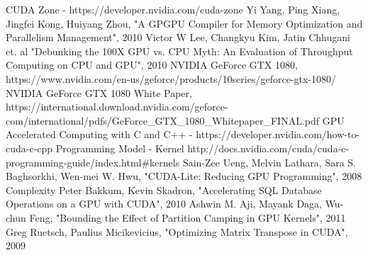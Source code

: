 \documentclass[conference]{IEEEtran}
\begin{document}
\begin{thebibliography}{00}
 CUDA Zone - https://developer.nvidia.com/cuda-zone
 Yi Yang, Ping Xiang, Jingfei Kong, Huiyang Zhou, "A GPGPU Compiler for Memory Optimization and Parallelism Management", 2010
 Victor W Lee, Changkyu Kim, Jatin Chhugani et. al "Debunking the 100X GPU vs. CPU Myth: An Evaluation of Throughput Computing on CPU and GPU", 2010
 NVIDIA GeForce GTX 1080, https://www.nvidia.com/en-us/geforce/products/10series/geforce-gtx-1080/
 NVIDIA GeForce GTX 1080 White Paper,
https://international.download.nvidia.com/geforce-com/international/pdfs/GeForce\_GTX\_1080\_Whitepaper\_FINAL.pdf
 GPU Accelerated Computing with C and C++ - https://developer.nvidia.com/how-to-cuda-c-cpp
 Programming Model - Kernel http://docs.nvidia.com/cuda/cuda-c-programming-guide/index.html\#kernels
 Sain-Zee Ueng, Melvin Lathara, Sara S. Baghsorkhi, Wen-mei W. Hwu, "CUDA-Lite: Reducing GPU Programming", 2008
Complexity
 Peter Bakkum, Kevin Skadron, "Accelerating SQL Database Operations on a GPU with CUDA", 2010
 Ashwin M. Aji, Mayank Daga, Wu-chun Feng, "Bounding the Effect of Partition Camping in GPU Kernels", 2011
 Greg Ruetsch, Paulius Micikevicius, "Optimizing Matrix Transpose in CUDA", 2009 



\end{thebibliography}
\end{document}
